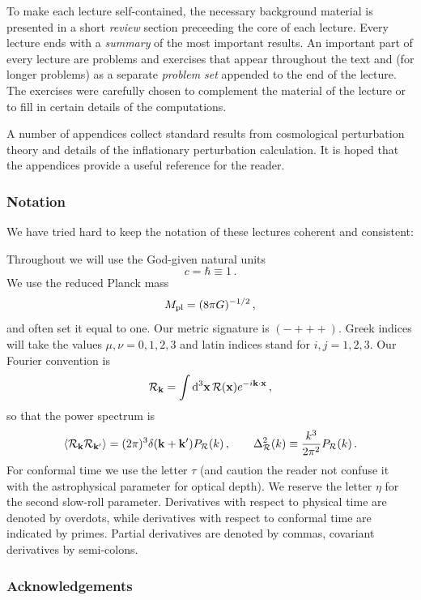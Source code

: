 \documentclass[12pt,letterpaper,rotate]{article}
\def\beq{\begin{equation}}
\def\eeq{\end{equation}}
\def\d{{\rm d}}
\def\R{{\cal R}}
\begin{document}
{\vskip 5pt
To make each lecture self-contained, the necessary background material is presented in a short {\sl review} section preceeding the core of each lecture.
Every lecture ends with a {\sl summary} of the most important results.
An important part of every lecture are problems and exercises that appear throughout the text and (for longer problems) as a separate {\sl problem set} appended to the end of the lecture.
The exercises were carefully chosen to complement the material of the lecture or to fill in certain details of the computations.

\vskip 5pt
A number of appendices collect standard results from cosmological perturbation theory and details of the inflationary perturbation calculation. It is hoped that the appendices provide a useful reference for the reader. 

\newpage
\subsubsection*{Notation}

We have tried hard to keep the notation of these lectures
coherent and consistent:

Throughout we will use the God-given natural units
\beq
c = \hbar  \equiv 1\, . \nonumber
\eeq
We use the reduced Planck mass
\beq
M_{\rm pl} = (8 \pi G)^{-1/2}\, , \nonumber
\eeq
and often set it equal to one.
Our metric signature is $(-+++)$. 
Greek indices will take the values $\mu, \nu =0,1,2,3$ and latin indices stand for $i,j=1,2,3$.
Our Fourier convention is
\beq
\R_{\bf k} = \int \d^3 {\bf x}\, \R({\bf x}) e^{-i {\bf k} \cdot {\bf x}}\, , \nonumber
\eeq
so that the power spectrum is
\beq
\langle \R_{\bf k} \R_{{\bf k}'} \rangle = (2\pi)^3 \delta({\bf k}+ {\bf k}') P_\R(k) \, , \qquad \Delta_\R^2(k) \equiv \frac{k^3}{2\pi^2} P_\R(k)\, . \nonumber
\eeq
For conformal time we use the letter $\tau$ (and caution the reader not confuse it with the astrophysical parameter for optical depth). We reserve the letter $\eta$ for the second slow-roll parameter. Derivatives with respect to physical time are denoted by overdots, while derivatives with respect to conformal time are indicated by primes.
Partial derivatives are denoted by commas, covariant derivatives by semi-colons.

\subsubsection*{Acknowledgements}

}
\end{document}
